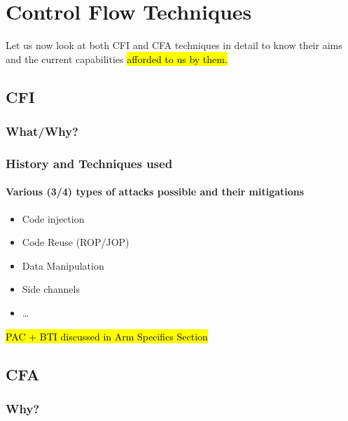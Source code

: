 \documentclass[a4paper, nobind]{templates/ociamthesis}
\providecommand{\tightlist}{%
  \setlength{\itemsep}{0pt}\setlength{\parskip}{0pt}}
\begin{document}
\section{Control Flow Techniques}\label{control-flow-techniques}

Let us now look at both CFI and CFA techniques in detail to know their aims and the current
capabilities \hl{afforded to us by them.}

\subsection{CFI}\label{cfi}

\subsubsection{What/Why?}\label{whatwhy}

\subsubsection{History and Techniques used}\label{history-and-techniques-used}

\paragraph{Various (3/4) types of attacks possible and their mitigations}\label{various-34-types-of-attacks-possible-and-their-mitigations}

\begin{itemize}
\tightlist
\item
  Code injection
\item
  Code Reuse (ROP/JOP)
\item
  Data Manipulation
\item
  Side channels
\item
  \ldots{}
\end{itemize}

\hl{PAC + BTI discussed in Arm Specifics Section}

\subsection{CFA}\label{cfa}

\subsubsection{Why?}\label{why}
\end{document}
